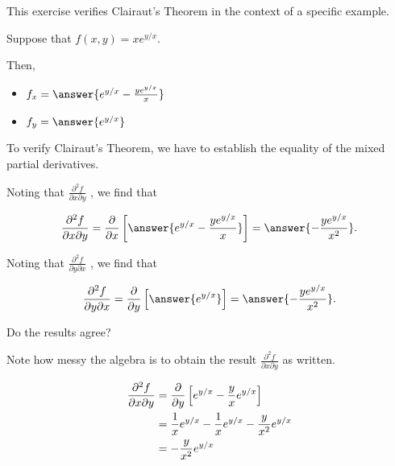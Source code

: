 \documentclass{ximera}
\author{Jim Talamo}
\newcommand{\Pp}[2]{\frac{\partial #1}{\partial #2}}
\begin{document}
\begin{exercise}
This exercise verifies Clairaut's Theorem in the context of a specific example.

Suppose that $f(x,y) = xe^{y/x}$.

Then,

\begin{itemize}
\item $f_x = \answer{e^{y/x} -\frac{ye^{y/x}}{x}}$
\item $f_y = \answer{e^{y/x}}$
\end{itemize}

To verify Clairaut's Theorem, we have to establish the equality of the mixed partial derivatives.

Noting that $\Pp{^2f}{x \partial y}$ , we find that 

\[
\Pp{^2f}{x \partial y} = \pp{x} \left[\answer{   e^{y/x} -\frac{ye^{y/x}}{x}   } \right] = \answer{-\frac{ye^{y/x}}{x^2}}.
\]

Noting that $\Pp{^2f}{y \partial x}$  , we find that 

\[
\Pp{^2f}{y \partial x}  = \pp{y} \left[\answer{e^{y/x}} \right] = \answer{-\frac{ye^{y/x}}{x^2}}.
\]

Do the results agree?
\begin{multipleChoice}
\end{multipleChoice}

\begin{feedback}[correct]
Note how messy the algebra is to obtain the result $\Pp{^2f}{x \partial y}$ as written.

\begin{align*}
\Pp{^2f}{x \partial y} & =  \pp{y} \left[   e^{y/x} -\frac{y}{x}e^{y/x} \right] \\
& =  \frac{1}{x}e^{y/x} -\frac{1}{x}e^{y/x}-\frac{y}{x^2}e^{y/x} \\
&= -\frac{y}{x^2}e^{y/x}
\end{align*}

\end{feedback}

\end{exercise}
\end{document}
